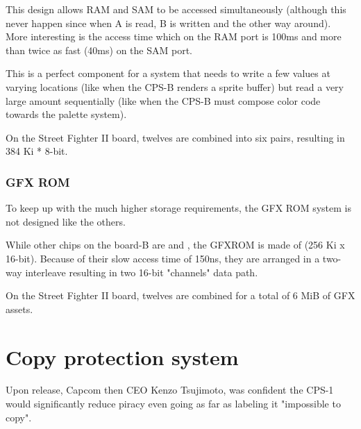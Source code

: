 This design allows RAM and SAM to be accessed simultaneously (although this never happen since when A is read, B is written and the other way around).
 More interesting is the access time which on the RAM port is 100ms and more than twice as fast (40ms) on the SAM port. 

 This is a perfect component for a system that needs to write a few values at varying locations (like when the CPS-B renders a sprite buffer) but read a very large amount sequentially (like when the CPS-B must compose color code towards the palette system).

 On the Street Fighter II board, twelves  are combined into six pairs, resulting in 384 Ki * 8-bit.







\subsubsection{GFX ROM}
To keep up with the much higher storage requirements, the GFX ROM system is not designed like the others. 

While other chips on the board-B are  and , the GFXROM is made of  (256 Ki x 16-bit). Because of their slow access time of 150ns, they are arranged in a two-way interleave resulting in two 16-bit "channels" data path.



On the Street Fighter II board, twelves  are combined for a total of 6 MiB of GFX assets.


\section{Copy protection system}

Upon release, Capcom then CEO Kenzo Tsujimoto, was confident the CPS-1 would significantly reduce piracy even going as far as labeling it "impossible to copy".

